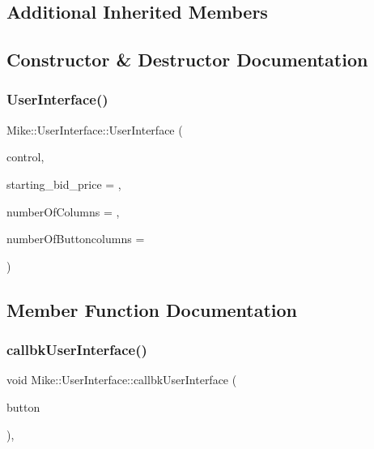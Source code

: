 \subsection*{Additional Inherited Members}


\subsection{Constructor \& Destructor Documentation}
\mbox{\label{class_mike_1_1_user_interface_a3c10edd966f5470fb76a7ee844de2628}} 
\subsubsection{\texorpdfstring{User\+Interface()}{UserInterface()}}
{\footnotesize\ttfamily Mike\+::\+User\+Interface\+::\+User\+Interface (\begin{DoxyParamCaption}\item[{\hyperlink{class_mike_1_1_control}{Control} $\ast$}]{control,  }\item[{double}]{starting\+\_\+bid\+\_\+price = {},  }\item[{int}]{number\+Of\+Columns = {},  }\item[{int}]{number\+Of\+Buttoncolumns = {} }\end{DoxyParamCaption})}



\subsection{Member Function Documentation}
\mbox{\label{class_mike_1_1_user_interface_a9421dadab2852eb9110e25e2dff1d849}} 
\subsubsection{\texorpdfstring{callbk\+User\+Interface()}{callbkUserInterface()}}
{\footnotesize\ttfamily void Mike\+::\+User\+Interface\+::callbk\+User\+Interface (\begin{DoxyParamCaption}\item[{\hyperlink{namespace_mike_a9dd611fa3c671b02e477e6b21465cc66}{Btn\+Pressed}}]{button }\end{DoxyParamCaption})\hspace{0.3cm}{\ttfamily [protected]}, {\ttfamily [virtual]}}



